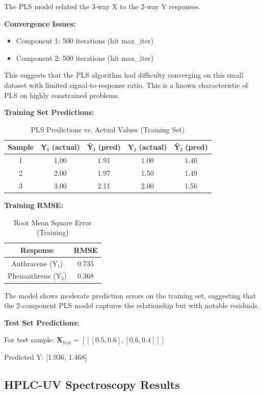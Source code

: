 \documentclass[12pt,a4paper]{article}
\begin{document}
The PLS model related the 3-way X to the 2-way Y responses.

\textbf{Convergence Issues:}
\begin{itemize}
    \item Component 1: 500 iterations (hit max\_iter)
    \item Component 2: 500 iterations (hit max\_iter)
\end{itemize}

This suggests that the PLS algorithm had difficulty converging on this small dataset with limited signal-to-response ratio. This is a known characteristic of PLS on highly constrained problems.

\textbf{Training Set Predictions:}
\begin{table}[H]
\centering
\caption{PLS Predictions vs. Actual Values (Training Set)}
\begin{tabular}{ccccc}
\toprule
Sample & Y₁ (actual) & Ŷ₁ (pred) & Y₂ (actual) & Ŷ₂ (pred) \\
\midrule
1 & 1.00 & 1.91 & 1.00 & 1.46 \\
2 & 2.00 & 1.97 & 1.50 & 1.49 \\
3 & 3.00 & 2.11 & 2.00 & 1.56 \\
\bottomrule
\end{tabular}
\end{table}

\textbf{Training RMSE:}
\begin{table}[H]
\centering
\caption{Root Mean Square Error (Training)}
\begin{tabular}{cc}
\toprule
Response & RMSE \\
\midrule
Anthracene (Y₁) & 0.735 \\
Phenanthrene (Y₂) & 0.368 \\
\bottomrule
\end{tabular}
\end{table}

The model shows moderate prediction errors on the training set, suggesting that the 2-component PLS model captures the relationship but with notable residuals.

\textbf{Test Set Predictions:}

For test sample: $\mathbf{X}_{test} = [[[0.5, 0.6], [0.6, 0.4]]]$

Predicted Y: [1.936, 1.468]

\subsection{HPLC-UV Spectroscopy Results}
\end{document}
